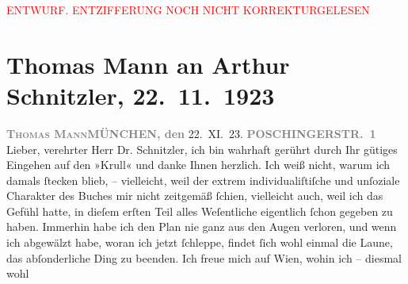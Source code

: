 
\begin{center}
            \textcolor{red}{ENTWURF. ENTZIFFERUNG NOCH NICHT KORREKTURGELESEN}
                      \end{center}
            
               \section[Thomas Mann an Arthur Schnitzler, 22. 11. 1923]{ Thomas Mann an Arthur Schnitzler, 22. 11. 1923}\nopagebreak{}\rehead{ }\begin{ledgroupsized}[t]{13cm}\normalsize\beginnumbering{} \toendnotes[C]{\smallbreak\pagebreak[2]} 
\toendnotes[C]{\smallbreak}\pstart
           \noindent{}{\pb}\textcolor{gray}{\textbf{\textsc{Thomas Mann}}}\hfill \textcolor{gray}{\textbf{MÜNCHEN, den}}{ }22. XI. 23.\pend
           \pstart
           \raggedleft{}\textcolor{gray}{\textbf{POSCHINGERSTR. 1}}\pend
           \pstart{}Lieber, verehrter Herr Dr. Schnitzler,\pend\pstart
           ich bin wahrhaft gerührt durch Ihr gütiges Eingehen auf den »Krull« und danke Ihnen herzlich. Ich weiß nicht, warum ich
                    damals ſtecken blieb, – vielleicht, weil der extrem individualiſtiſche und
                    unſoziale Charakter des Buches mir nicht zeitgemäß ſchien, vielleicht auch, weil
                    ich das Gefühl hatte, in dieſem erſten Teil alles We{\pb}ſentliche
                    eigentlich ſchon gegeben zu haben. Immerhin habe ich den Plan nie ganz aus den
                    Augen verloren, und wenn ich abgewälzt habe, woran ich jetzt ſchleppe, findet
                    ſich wohl einmal die Laune, das abſonderliche Ding zu beenden.\pend
           \pstart
           Ich freue mich auf Wien, wohin ich – diesmal wohl

\end{ledgroupsized}
